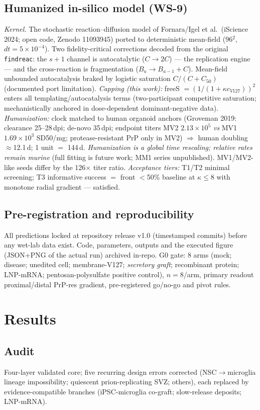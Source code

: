 \documentclass[10pt,twocolumn]{article}
\begin{document}
\subsection{Humanized in-silico model (WS-9)}
\emph{Kernel.} The stochastic reaction--diffusion model of Fornara/Igel et al.\ (iScience 2024; open code, Zenodo 11093945) ported to deterministic mean-field (96$^2$, $dt{=}5{\times}10^{-4}$). Two fidelity-critical corrections decoded from the original \texttt{findreac}: the $s{+}1$ channel is autocatalytic ($C{\to}2C$) --- the replication engine --- and the cross-reaction is fragmentation ($B_a{\to}B_{a-1}{+}C$). Mean-field unbounded autocatalysis braked by logistic saturation $C/(C+C_{50})$ (documented port limitation). \emph{Capping (this work):} freeS $=(1/(1+\kappa c_{V127}))^{2}$ enters all templating/autocatalysis terms (two-participant competitive saturation; mechanistically anchored in dose-dependent dominant-negative data). \emph{Humanization:} clock matched to human organoid anchors (Groveman 2019: clearance 25--28\,dpi; de-novo 35\,dpi; endpoint titers MV2 $2.13{\times}10^{5}$ \emph{vs} MV1 $1.69{\times}10^{3}$ SD50/mg; protease-resistant PrP only in MV2) $\Rightarrow$ human doubling $\approx$12.1\,d; 1 unit $=$ 144\,d. \emph{Humanization is a global time rescaling; relative rates remain murine} (full fitting is future work; MM1 series unpublished). MV1/MV2-like seeds differ by the 126$\times$ titer ratio. \emph{Acceptance tiers:} T1/T2 minimal screening; T3 informative success $=$ front $<$50\% baseline at $\kappa\le8$ with monotone radial gradient --- satisfied.

\subsection{Pre-registration and reproducibility}
All predictions locked at repository release v1.0 (timestamped commits) before any wet-lab data exist. Code, parameters, outputs and the executed figure (JSON+PNG of the actual run) archived in-repo. G0 gate: 8 arms (mock; disease; unedited cell; membrane-V127; \emph{secretory graft}; recombinant protein; LNP-mRNA; pentosan-polysulfate positive control), $n{=}8$/arm, primary readout proximal/distal PrP-res gradient, pre-registered go/no-go and pivot rules.

\section{Results}
\subsection{Audit} Four-layer validated core; five recurring design errors corrected (NSC$\to$microglia lineage impossibility; quiescent prion-replicating SVZ; others), each replaced by evidence-compatible branches (iPSC-microglia co-graft; slow-release deposits; LNP-mRNA).
\end{document}
